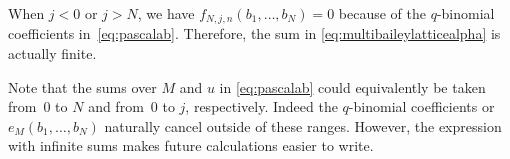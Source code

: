 \begin{Remark}
When $j<0$ or $j > N$, we have $f_{N,j,n}(b_1,\ldots,b_N) =0$ because of the $q$-binomial coefficients in~\eqref{eq:pascalab}. Therefore, the sum in \eqref{eq:multibaileylatticealpha} is actually finite.
\end{Remark}

\begin{Remark}
Note that the sums over $M$ and $u$ in \eqref{eq:pascalab} could equivalently be taken from~$0$ to $N$ and from~$0$ to $j$, respectively. Indeed the $q$-binomial coefficients or $e_M(b_1,\dots ,b_N)$ naturally cancel outside of these ranges. However, the expression with infinite sums makes future calculations easier to write.
\end{Remark}

